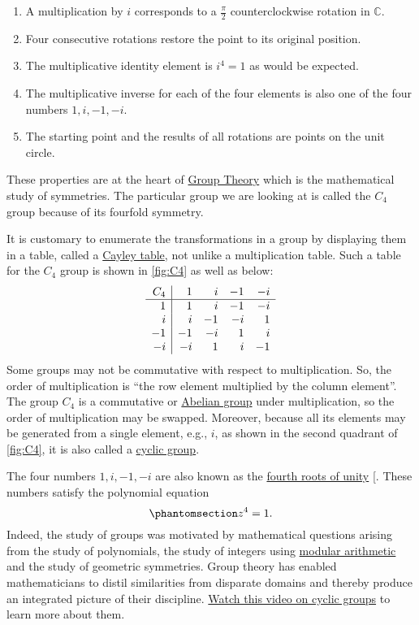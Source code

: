 \documentclass[
  a4paper,
]{article}
\providecommand{\tightlist}{%
  \setlength{\itemsep}{0pt}\setlength{\parskip}{0pt}}
\begin{document}
\begin{enumerate}
\tightlist
\item
  A multiplication by \(i\) corresponds to a \(\frac{\pi}{2}\)
  counterclockwise rotation in \(\mathbb{C}\).
\item
  Four consecutive rotations restore the point to its original position.
\item
  The multiplicative identity element is \(i^4 = 1\) as would be
  expected.
\item
  The multiplicative inverse for each of the four elements is also one
  of the four numbers \(1, i, -1, -i\).
\item
  The starting point and the results of all rotations are points on the
  unit circle.
\end{enumerate}

These properties are at the heart of
\href{https://en.wikipedia.org/wiki/Group_(mathematics)}{Group Theory}
which is the mathematical study of symmetries. The particular group we
are looking at is called the \(C_4\) group because of its fourfold
symmetry.

It is customary to enumerate the transformations in a group by
displaying them in a table, called a
\href{https://en.wikipedia.org/wiki/Cayley_table}{Cayley table}, not
unlike a multiplication table. Such a table for the \(C_4\) group is
shown in \cref{fig:C4} as well as below: \[
\begin{array}{r | r  r  r  r}
C_{4} & 1  & i & -1 & -i\\
\hline
1 & 1 & i & -1 & -i\\
i & i & -1 & -i  & 1\\
-1 & -1 & -i & 1 & i\\
-i & -i & 1  & i & -1\\
\end{array}
\] Some groups may not be commutative with respect to multiplication.
So, the order of multiplication is ``the row element multiplied by the
column element''. The group \(C_4\) is a commutative or
\href{https://en.wikipedia.org/wiki/Abelian_group}{Abelian group} under
multiplication, so the order of multiplication may be swapped. Moreover,
because all its elements may be generated from a single element, e.g.,
\(i\), as shown in the second quadrant of \cref{fig:C4}, it is also
called a \href{https://en.wikipedia.org/wiki/Cyclic_group}{cyclic
group}.

The four numbers \(1, i, -1, -i\) are also known as the
\href{https://mathworld.wolfram.com/RootofUnity.html}{fourth roots of
unity} {[}\citeproc{ref-honner2021}{3}{]}. These numbers satisfy the
polynomial equation \begin{equation}\phantomsection\label{eq:z4poly}{
z^4 = 1.
}\end{equation} Indeed, the study of groups was motivated by
mathematical questions arising from the study of polynomials, the study
of integers using
\href{https://en.wikipedia.org/wiki/Modular_arithmetic}{modular
arithmetic} and the study of geometric symmetries. Group theory has
enabled mathematicians to distil similarities from disparate domains and
thereby produce an integrated picture of their discipline.
\href{https://www.youtube.com/watch?v=8A84sA1YuPw}{Watch this video on
cyclic groups} to learn more about them.
\end{document}
